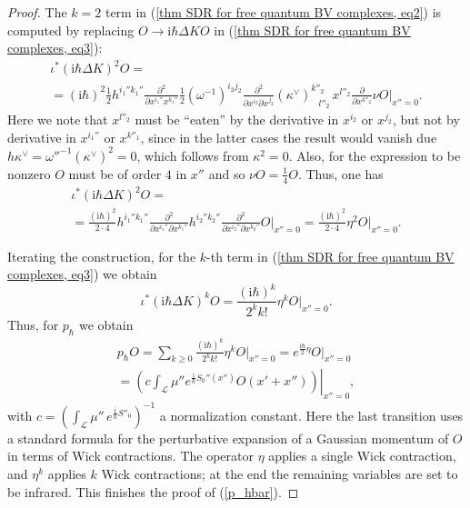 \documentclass{amsart}
\theoremstyle{plain} %
\theoremstyle{definition}
\theoremstyle{remark}
\newcommand{\ra}{\rightarrow}
\newcommand{\LL}{\mathcal{L}}
\newcommand{\dd}{\partial}
\newcommand{\iii}{\mathrm{i}}
\begin{document}
\begin{proof}
    The $k=2$ term in (\ref{thm SDR for free quantum BV complexes, eq2}) is computed by replacing $O\ra \iii\hbar \Delta K O$ in (\ref{thm SDR for free quantum BV complexes, eq3}):
    \begin{multline}
        \iota^* (\iii\hbar \Delta K)^2 O=\\=
        (\iii\hbar)^2\frac12 h^{i_1'' k_1''} \frac{\dd^2}{\dd x^{i_1''}x^{k_1''}} \frac12 (\omega^{-1})^{i_2j_2} \frac{\dd^2}{\dd x^{i_2}\dd x^{j_2}} (\kappa^\vee)^{k''_2}_{\;\;\; l''_2}\, x^{l''_2} \frac{\dd}{\dd x^{k''_2}}\nu O \Big|_{x''=0}.
    \end{multline}
    Here we note that $x^{l''_2}$ must be ``eaten'' by the derivative in $x^{i_2}$ or $x^{j_2}$, but not by derivative in $x^{i_1''}$ or $x^{k''_1}$, since in the latter cases the result would vanish due $h\kappa^\vee=\omega''^{-1}(\kappa^\vee)^2=0$, which follows from $\kappa^2=0$. Also, for the expression to be nonzero $O$ must be of order $4$ in $x''$ and so $\nu O=\frac14 O$.
    Thus, one has
    \begin{multline}
     \iota^* (\iii\hbar \Delta K)^2 O=\\
     =\frac{(\iii\hbar)^2}{2\cdot 4}
     h^{i_1'' k_1''} \frac{\dd^2}{\dd x^{i_1''} \dd x^{k_1''}} 
     h^{i_2'' k_2''} \frac{\dd^2}{\dd x^{i_2''} \dd x^{k_2''}} O\Big|_{x''=0}
     =\frac{(\iii\hbar)^2}{2\cdot 4}\eta^2 O\Big|_{x''=0}.
    \end{multline}
    
    Iterating the construction, for the $k$-th term in (\ref{thm SDR for free quantum BV complexes, eq3}) we obtain
    \begin{equation}
        \iota^* (\iii\hbar \Delta K)^k O=
        \frac{(\iii\hbar)^k}{2^k k!}\eta^k O\Big|_{x''=0}.
    \end{equation}
    Thus, for $p_\hbar$ we obtain
    \begin{multline}\label{thm SDR for free quantum BV complexes, eq4}
        p_\hbar O=\sum_{k\geq 0} \frac{(\iii\hbar)^k}{2^k k!}\eta^k O\Big|_{x''=0}
        =e^{\frac{\iii\hbar}{2} \eta} O\Big|_{x''=0}
        \\= \left.\left(c\int_\LL \mu'' e^{\frac{\iii}{\hbar}S_0''(x'')} O(x'+x'')\right)\right|_{x''=0},
    \end{multline}
    with $c=\left(\int_\LL \mu''\, e^{\frac{\iii}{\hbar}S''_0}\right)^{-1}$ a normalization constant.
    Here the last transition uses a standard formula for the perturbative expansion of a Gaussian momentum of $O$ in terms of Wick contractions. The operator $\eta$ applies a single Wick contraction, and $\eta^k$ applies $k$ Wick contractions; at the end the remaining variables are set to be infrared. This finishes the proof of (\ref{p_hbar}).
\end{proof}
\end{document}
